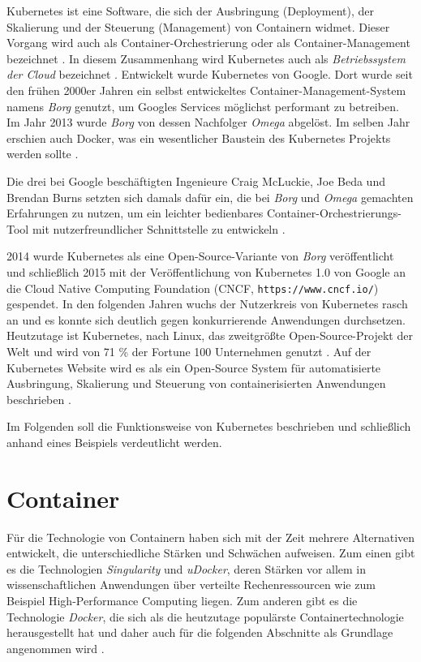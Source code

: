 \documentclass[11pt,a4paper]{article}
\begin{document}
Kubernetes ist eine Software, die sich der Ausbringung (Deployment), der Skalierung und der Steuerung (Management) von Containern widmet.
Dieser Vorgang wird auch als Container-Orchestrierung oder als Container-Management bezeichnet \cite{Bisong2019}.
In diesem Zusammenhang wird Kubernetes auch als \emph{Betriebssystem der Cloud} bezeichnet \cite{Schmeling_Dargatz_2022}.
Entwickelt wurde Kubernetes von Google. Dort wurde seit den frühen 2000er Jahren ein selbst entwickeltes Container-Management-System namens \emph{Borg} genutzt,
um Googles Services möglichst performant zu betreiben.
Im Jahr 2013 wurde \emph{Borg} von dessen Nachfolger \emph{Omega} abgelöst. Im selben Jahr erschien auch Docker, was ein wesentlicher Baustein des Kubernetes
Projekts werden sollte \cite{ibm_history}.

Die drei bei Google beschäftigten Ingenieure Craig McLuckie, Joe Beda und Brendan Burns setzten sich damals dafür ein,
die bei \emph{Borg} und \emph{Omega} gemachten Erfahrungen zu nutzen, um ein leichter bedienbares Container-Orchestrierungs-Tool
mit nutzerfreundlicher Schnittstelle zu entwickeln \cite{ibm_history}.

2014 wurde Kubernetes als eine Open-Source-Variante von \emph{Borg} veröffentlicht und schließlich 2015 mit der Veröffentlichung von Kubernetes 1.0
von Google an die Cloud Native Computing Foundation (CNCF, \lstinline|https://www.cncf.io/|) gespendet. In den folgenden Jahren wuchs der Nutzerkreis von Kubernetes
rasch an und es konnte sich deutlich gegen konkurrierende Anwendungen durchsetzen.
Heutzutage ist Kubernetes, nach Linux, das zweitgrößte Open-Source-Projekt der Welt und wird von 71 \% der Fortune 100 Unternehmen genutzt
\cite{ibm_history} \cite{kubernetes_journey}.
Auf der Kubernetes Website wird es als ein Open-Source System für automatisierte Ausbringung, Skalierung
und Steuerung von containerisierten Anwendungen beschrieben \cite{kubernetes.io_start}.

Im Folgenden soll die Funktionsweise von Kubernetes beschrieben und schließlich anhand eines Beispiels
verdeutlicht werden.

\section{Container}
\label{sec:Container}

Für die Technologie von Containern haben sich mit der Zeit mehrere Alternativen entwickelt, die unterschiedliche
Stärken und Schwächen aufweisen. Zum einen gibt es die Technologien \emph{Singularity} und \emph{uDocker}, deren Stärken
vor allem in wissenschaftlichen Anwendungen über verteilte Rechenressourcen wie zum Beispiel High-Performance Computing
liegen. Zum anderen gibt es die Technologie \emph{Docker}, die sich als die heutzutage populärste Containertechnologie
herausgestellt hat und daher auch für die folgenden Abschnitte als Grundlage angenommen wird \cite{Bentaleb_Belloum_Sebaa_El-Maouhab_2021}.
\end{document}
